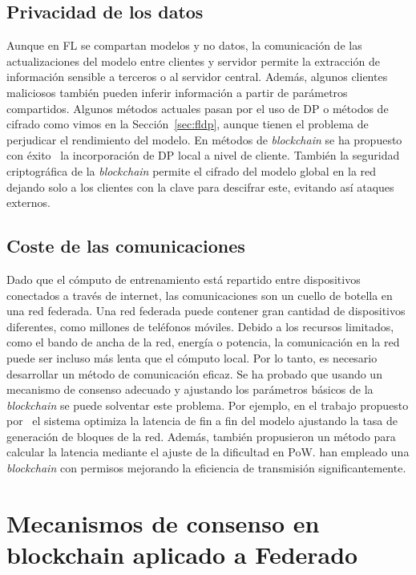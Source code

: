 \subsection{Privacidad de los datos}
Aunque en \ac{FL} se compartan modelos y no datos, la comunicación de las actualizaciones del modelo entre clientes y servidor permite la extracción de información sensible a terceros o al servidor central. Además, algunos clientes maliciosos también pueden inferir información a partir de parámetros compartidos. Algunos métodos actuales pasan por el uso de \ac{DP} o métodos de  cifrado como vimos en la Sección~\ref{sec:fldp}, aunque tienen el problema de perjudicar el rendimiento del modelo. En métodos de \textit{blockchain} se ha propuesto con éxito~\cite{mcmahan-2018} la incorporación de \ac{DP} local a nivel de cliente. También la seguridad criptográfica de la \textit{blockchain} permite el cifrado del modelo global en la red dejando solo a los clientes con la clave para descifrar este, evitando así ataques externos.


\subsection{Coste de las comunicaciones}
Dado que el cómputo de entrenamiento está repartido entre dispositivos conectados a través de internet, las comunicaciones son un cuello de botella en una red federada. Una red federada puede contener gran cantidad de dispositivos diferentes, como millones de teléfonos móviles. Debido a los recursos limitados, como el bando de ancha de la red, energía o potencia, la comunicación en la red puede ser incluso más lenta que el cómputo local. Por lo tanto, es necesario desarrollar un método de comunicación eficaz. Se ha probado que usando un mecanismo de consenso adecuado y ajustando los parámetros básicos de la \textit{blockchain} se puede solventar este problema. Por ejemplo, en el trabajo propuesto por~\citet{kim-2020-blockfl} el sistema optimiza la latencia de fin a fin del modelo ajustando la tasa de generación de bloques de la red. Además, también propusieron un método para calcular la latencia mediante el ajuste de la dificultad en \ac{PoW}. \citet{majeed-2019} han empleado una \textit{blockchain} con permisos mejorando la eficiencia de transmisión significantemente.

\section{Mecanismos de consenso en blockchain aplicado a Federado}

